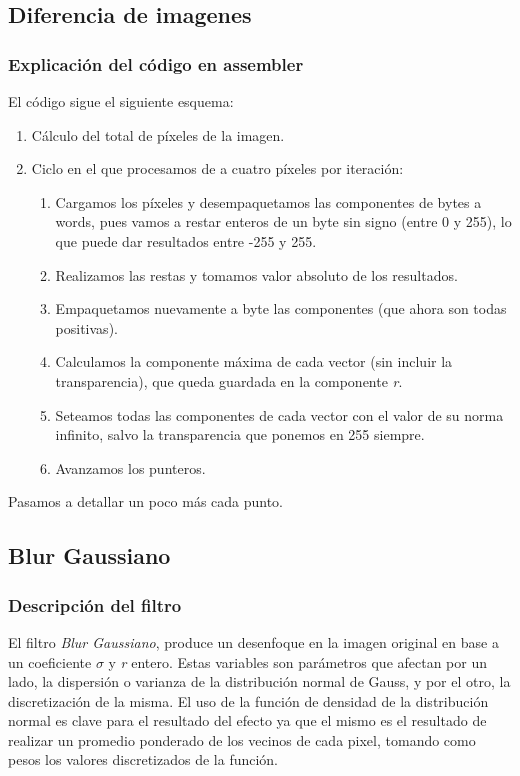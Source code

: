 \subsection{Diferencia de imagenes}

\subsubsection{Explicación del código en assembler}
El código sigue el siguiente esquema:
\begin{enumerate}
	\item Cálculo del total de píxeles de la imagen.
	\item Ciclo en el que procesamos de a cuatro píxeles por iteración:
	\begin{enumerate}
		\item Cargamos los píxeles y desempaquetamos las componentes de bytes a words, pues vamos a restar enteros de un byte sin signo (entre 0 y 255), lo que puede dar resultados entre -255 y 255.
		\item Realizamos las restas y tomamos valor absoluto de los resultados.
		\item Empaquetamos nuevamente a byte las componentes (que ahora son todas positivas).
		\item Calculamos la componente máxima de cada vector (sin incluir la transparencia), que queda guardada en la componente \emph{r}.
		\item Seteamos todas las componentes de cada vector con el valor de su norma infinito, salvo la transparencia que ponemos en 255 siempre. 
		\item Avanzamos los punteros.
	\end{enumerate}
\end{enumerate}

Pasamos a detallar un poco más cada punto.




\subsection{Blur Gaussiano}

\subsubsection{Descripción del filtro}

El filtro \textit{Blur Gaussiano}, produce un desenfoque en la imagen original
en base a un coeficiente $\sigma$ y \textit{r} entero. Estas variables son
parámetros que afectan por un lado, la dispersión o varianza de la distribución
normal de Gauss, y por el otro, la discretización de la misma. El uso de la
función de densidad de la distribución normal es clave para el resultado del
efecto ya que el mismo es el resultado de realizar un promedio ponderado de
los vecinos de cada pixel, tomando como pesos los valores discretizados de la
función.

